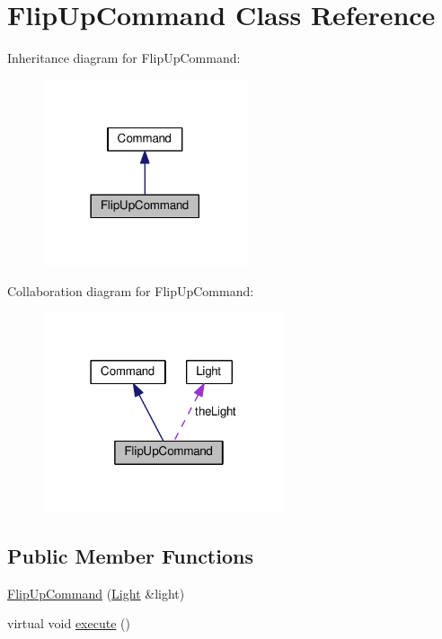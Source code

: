 \hypertarget{classFlipUpCommand}{}\section{Flip\+Up\+Command Class Reference}
\label{classFlipUpCommand}


Inheritance diagram for Flip\+Up\+Command\+:
\nopagebreak
\begin{figure}[H]
\begin{center}
\leavevmode
\includegraphics[width=170pt]{classFlipUpCommand__inherit__graph}
\end{center}
\end{figure}


Collaboration diagram for Flip\+Up\+Command\+:
\nopagebreak
\begin{figure}[H]
\begin{center}
\leavevmode
\includegraphics[width=202pt]{classFlipUpCommand__coll__graph}
\end{center}
\end{figure}
\subsection*{Public Member Functions}
\begin{DoxyCompactItemize}
\item 
\hyperlink{classFlipUpCommand_aae6e1231a8e842aa6d91843a2b2280ca}{Flip\+Up\+Command} (\hyperlink{classLight}{Light} \&light)
\item 
virtual void \hyperlink{classFlipUpCommand_a5130aaef4e36aa54f5a6a466b779b225}{execute} ()
\end{DoxyCompactItemize}

